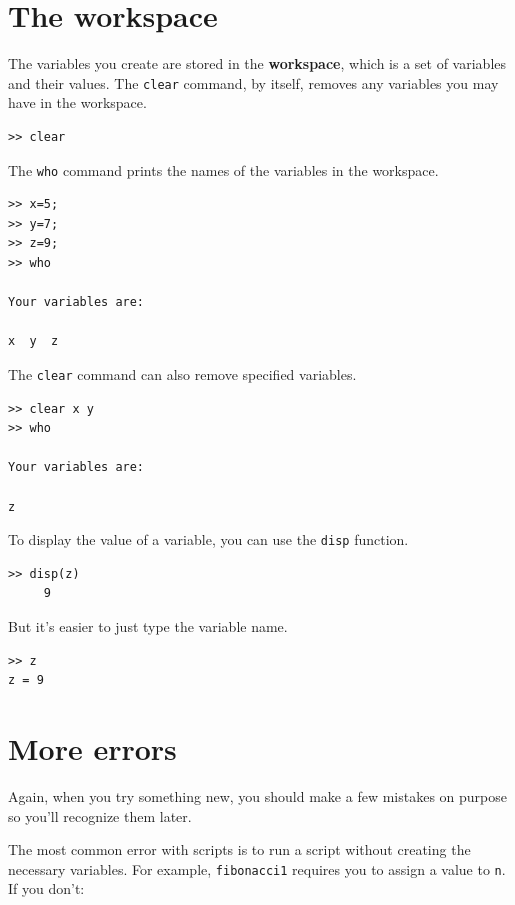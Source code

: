 \documentclass{book}
\begin{document}
\section{The workspace}

The variables you create are stored in the {\bf workspace}, which is a
set of variables and their values.
The {\tt clear} command, by itself, removes any variables you may
have in the workspace.

\begin{verbatim}
>> clear
\end{verbatim}

The {\tt who} command prints the
names of the variables in the workspace.

\begin{verbatim}
>> x=5;
>> y=7;
>> z=9;
>> who

Your variables are:

x  y  z
\end{verbatim}

The {\tt clear} command can also remove specified variables.

\begin{verbatim}
>> clear x y
>> who

Your variables are:

z
\end{verbatim}

To display the value of a variable, you can use the {\tt disp}
function.

\begin{verbatim}
>> disp(z)
     9
\end{verbatim}

But it's easier to just type the variable name.

\begin{verbatim}
>> z
z = 9
\end{verbatim}

\section{More errors}

Again, when you try something new, you should make a few mistakes
on purpose so you'll recognize them later.

The most common error with scripts is to run a script without creating
the necessary variables.  For example, {\tt fibonacci1} requires you
to assign a value to {\tt n}.  If you don't:
\end{document}
